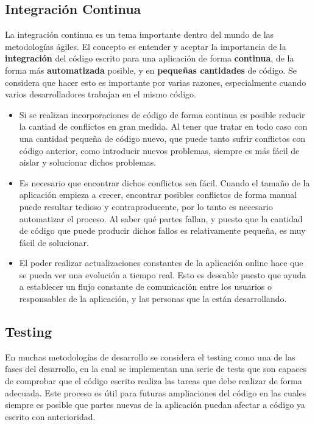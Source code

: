 
\subsection{Integración Continua} %
\label{sub:ic}

La integración continua es un tema importante dentro del mundo de las metodologías ágiles. El concepto es entender y aceptar la importancia de la \textbf{integración} del código escrito para una aplicación de forma \textbf{continua}, de la forma más \textbf{automatizada} posible, y en \textbf{pequeñas cantidades} de código. Se considera que hacer esto es importante por varias razones, especialmente cuando varios desarrolladores trabajan en el mismo código.

\begin{itemize}
	\item Si se realizan incorporaciones de código de forma continua es posible reducir la cantiad de conflictos en gran medida. Al tener que tratar en todo caso con una cantidad pequeña de código nuevo, que puede tanto sufrir conflictos con código anterior, como introducir nuevos problemas, siempre es más fácil de aislar y solucionar dichos problemas.
	\item Es necesario que encontrar dichos conflictos sea fácil. Cuando el tamaño de la aplicación empieza a crecer, encontrar posibles conflictos de forma manual puede resultar tedioso y contraproducente, por lo tanto es necesario automatizar el proceso. Al saber qué partes fallan, y puesto que la cantidad de código que puede producir dichos fallos es relativamente pequeña, es muy fácil de solucionar.
	\item El poder realizar actualizaciones constantes de la aplicación online hace que se pueda ver una evolución a tiempo real. Esto es deseable puesto que ayuda a establecer un flujo constante de comunicación entre los usuarios o responsables de la aplicación, y las personas que la están desarrollando.
\end{itemize}


\subsection{Testing} %
\label{sub:testing}

En muchas metodologías de desarrollo se considera el testing como una de las fases del desarrollo, en la cual se implementan una serie de tests que son capaces de comprobar que el código escrito realiza las tareas que debe realizar de forma adecuada. Este proceso es útil para futuras ampliaciones del código en las cuales siempre es posible que partes nuevas de la aplicación puedan afectar a código ya escrito con anterioridad.

